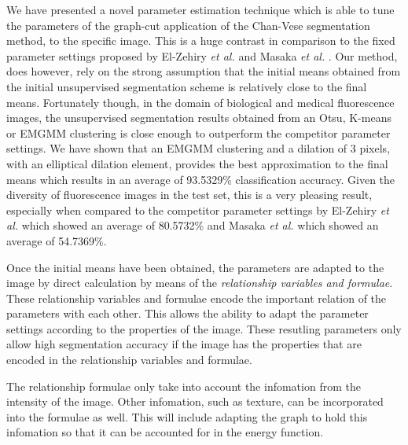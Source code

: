 \documentclass[10pt, journal, letterpaper, onecolumn, draftcls]{IEEEtran}
\begin{document}
We have presented a novel parameter estimation technique which is able to tune the parameters of the graph-cut application of the Chan-Vese segmentation method, to the specific image.
This is a huge contrast in comparison to the fixed parameter settings proposed by El-Zehiry \textit{et al.} \cite{ElZehiry2007} and Masaka \textit{et al.} \cite{Maska2013}.
Our method, does however, rely on the strong assumption that the initial means obtained from the initial unsupervised segmentation scheme is relatively close to the final means. 
Fortunately though, in the domain of biological and medical fluorescence images, the unsupervised segmentation results obtained from an Otsu, K-means or EMGMM clustering is close enough to outperform the competitor parameter settings. We have shown that an EMGMM clustering and a dilation of 3 pixels, with an elliptical dilation element, provides the best approximation to the final means which results in an average of 93.5329\% classification accuracy. Given the diversity of fluorescence images in the test set, this is a very pleasing result, especially when compared to the competitor parameter settings by El-Zehiry \textit{et al.} \cite{ElZehiry2007} which showed an average of 80.5732\% and Masaka \textit{et al.} \cite{Maska2013} which showed an average of 54.7369\%.

Once the initial means have been obtained, the parameters are adapted to the image by direct calculation by means of the \textit{relationship variables and formulae}. These relationship variables and formulae encode the important relation of the parameters with each other. This allows the  ability to adapt the parameter settings according to the properties of the image. These resutling parameters only allow high segmentation accuracy if the image has the properties that are encoded in the relationship variables and formulae.

The relationship formulae only take into account the infomation from the intensity of the image. Other infomation, such as texture, can be incorporated into the formulae as well. This will include adapting the graph to hold this infomation so that it can be accounted for in the energy function.
\end{document}
